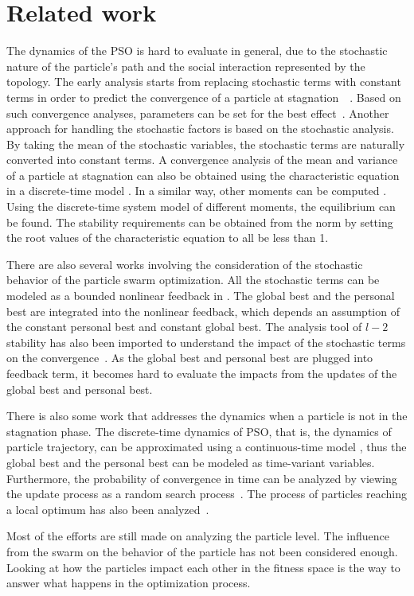 \section{Related work}
\label{sec:rel_work}

The dynamics of the PSO is hard to evaluate in general, due to the stochastic nature of the particle's path and the social interaction represented by the topology.
The early analysis starts from replacing stochastic terms with constant terms in order to predict the convergence of a particle at stagnation~\cite{985692}~\cite{4424687}.
Based on such convergence analyses, parameters can be set for the best effect~\cite{Trelea2003317}.
Another approach for handling the stochastic factors is based on the stochastic analysis.
By taking the mean of the stochastic variables, the stochastic terms are naturally converted into
constant terms.
A convergence analysis of the mean and variance of a particle at stagnation can also be obtained using the characteristic equation in a discrete-time model 
\cite{Jiang20078}.
In a similar way, 
other moments can be computed
\cite{5175367,Poli:2007:EAS:1276958.1276977,Poli:2008:DSS:1384929.1384944}.
Using the discrete-time system model of different moments, the equilibrium can be found.
The stability requirements can be obtained from the norm by setting the root values of the characteristic equation to all be less than 1.

There are also several works involving the consideration of the stochastic behavior of the particle swarm optimization.
All the stochastic terms can be modeled as a bounded nonlinear feedback in \cite{1637686}.
The global best and the personal best are integrated into the nonlinear feedback, which depends an assumption of the constant personal best and constant global best.
The analysis tool of $ l-2 $ stability has also been imported to understand the impact of the stochastic terms on the convergence~\cite{5160341}.
As the global best and personal best are plugged into feedback term, it becomes hard to evaluate the impacts from the updates of the global best and personal best.

There is also some work that addresses the dynamics when a particle is not in the stagnation phase.
The discrete-time dynamics of PSO, that is, the dynamics of particle trajectory, can be approximated
using a continuous-time model
\cite{5675669}, thus the global best and the personal best can be modeled as time-variant variables.
Furthermore, the probability of convergence in time can be analyzed by viewing the update process as a random search process~\cite{vandenBergh:2010:CPP:2010420.2010421}.
The process of particles reaching a local optimum has also been analyzed~\cite{Schmitt:2013:PSO:2463372.2463563}.

Most of the efforts are still made on analyzing the particle level.
The influence from the swarm on the behavior of the particle has not been considered enough.
Looking at how the particles impact each other in the fitness space is the way to answer what happens in the optimization process.


